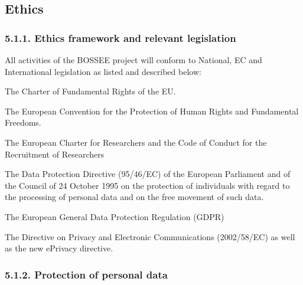 \subsection{Ethics}

\subsubsection{5.1.1. Ethics framework and relevant legislation}

All activities of the BOSSEE project will conform to National, EC and International legislation as listed and described below:
\begin{compactitem}
\item The Charter of Fundamental Rights of the EU.
\item The European Convention for the Protection of Human Rights and Fundamental Freedoms.
\item The European Charter for Researchers and the Code of Conduct for the Recruitment of Researchers
\item The Data Protection Directive (95/46/EC) of the European Parliament and of the Council of 24 October 1995 on the protection of individuals with regard to the processing of personal data and on the free movement of such data.
\item The European General Data Protection Regulation (GDPR)
\item The Directive on Privacy and Electronic Communications (2002/58/EC) as well as the new ePrivacy directive.
\end{compactitem}

\subsubsection{5.1.2. Protection of personal data}

